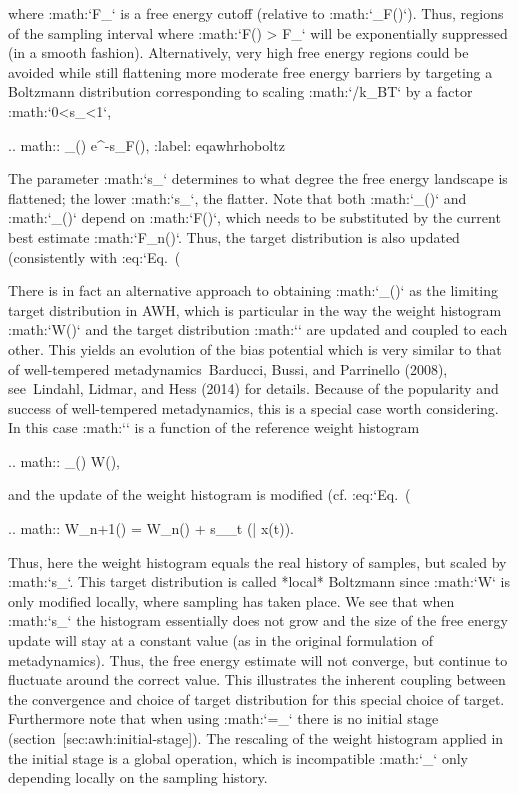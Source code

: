 where :math:`F_{}` is a free energy cutoff (relative to
:math:`\min_\lambda F(\lambda)`). Thus, regions of the sampling interval
where :math:`F(\lambda) > F_{}` will be exponentially
suppressed (in a smooth fashion). Alternatively, very high free energy
regions could be avoided while still flattening more moderate free
energy barriers by targeting a Boltzmann distribution corresponding to
scaling :math:`/k_BT` by a factor :math:`0<s_\beta<1`,

.. math:: \rho_{}(\lambda) \propto e^{-s_\beta F(\lambda)},
          :label: eqawhrhoboltz

The parameter :math:`s_\beta` determines to what degree the free energy
landscape is flattened; the lower :math:`s_\beta`, the flatter. Note
that both :math:`\rho_{}(\lambda)` and
:math:`\rho_{}(\lambda)` depend on :math:`F(\lambda)`,
which needs to be substituted by the current best estimate
:math:`F_n(\lambda)`. Thus, the target distribution is also updated
(consistently with :eq:`Eq. (%

There is in fact an alternative approach to obtaining
:math:`\rho_{}(\lambda)` as the limiting target
distribution in AWH, which is particular in the way the weight histogram
:math:`W(\lambda)` and the target distribution :math:`\rho` are updated
and coupled to each other. This yields an evolution of the bias
potential which is very similar to that of well-tempered
metadynamics Barducci, Bussi, and Parrinello (2008), see Lindahl,
Lidmar, and Hess (2014) for details. Because of the popularity and
success of well-tempered metadynamics, this is a special case worth
considering. In this case :math:`\rho` is a function of the reference
weight histogram

.. math:: \rho_{}(\lambda) \propto W(\lambda), 

and the update of the weight histogram is modified (cf.
:eq:`Eq. (%

.. math:: W_{n+1}(\lambda) =  W_{n}(\lambda) + s_{\beta}\sum_t \omega(\lambda | x(t)).

Thus, here the weight histogram equals the real history of samples, but
scaled by :math:`s_\beta`. This target distribution is called *local*
Boltzmann since :math:`W` is only modified locally, where sampling has
taken place. We see that when :math:`s_\beta {}` the histogram
essentially does not grow and the size of the free energy update will
stay at a constant value (as in the original formulation of
metadynamics). Thus, the free energy estimate will not converge, but
continue to fluctuate around the correct value. This illustrates the
inherent coupling between the convergence and choice of target
distribution for this special choice of target. Furthermore note that
when using :math:`\rho=\rho_{}` there is no initial
stage (section [sec:awh:initial-stage]). The rescaling of the weight
histogram applied in the initial stage is a global operation, which is
incompatible :math:`\rho_{}` only depending locally on
the sampling history.

